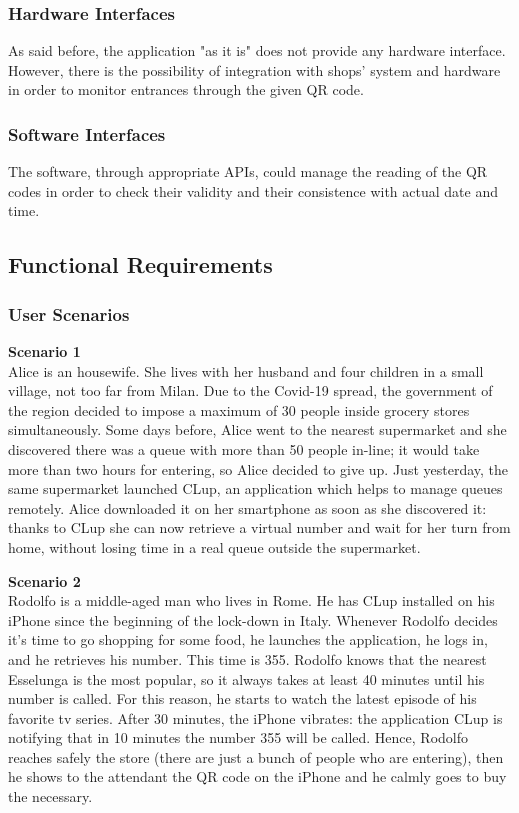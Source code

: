 \documentclass[table, 12pt]{article}
\begin{document}
\subsubsection{Hardware Interfaces}
As said before, the application "as it is" does not provide any hardware interface.
However, there is the possibility of integration with shops' system and hardware in order to monitor entrances through the given QR code.
\subsubsection{Software Interfaces}
The software, through appropriate APIs, could manage the reading of the QR codes in order to check their validity and their consistence with actual date and time.

\begin{minipage}{\textwidth}
    \subsection{Functional Requirements}
    \subsubsection{User Scenarios}
    \textbf{Scenario 1}\\
    Alice is an housewife. She lives with her husband and four children in a small village, not too far from Milan. Due to the Covid-19 spread, the government of the region decided to impose a maximum of 30 people inside grocery stores simultaneously. Some days before, Alice went to the nearest supermarket and she discovered there was a queue with more than 50 people in-line; it would take more than two hours for entering, so Alice decided to give up. Just yesterday, the same supermarket launched CLup, an application which helps to manage queues remotely. Alice downloaded it on her smartphone as soon as she discovered it: thanks to CLup she can now retrieve a virtual number and wait for her turn from home, without losing time in a real queue outside the supermarket.\\
\end{minipage}

\begin{minipage}{\textwidth}
    \textbf{Scenario 2}\\
    Rodolfo is a middle-aged man who lives in Rome. He has CLup installed on his iPhone since the beginning of the lock-down in Italy. Whenever Rodolfo decides it's time to go shopping for some food, he launches the application, he logs in, and he retrieves his number. This time is 355. Rodolfo knows that the nearest Esselunga is the most popular, so it always takes at least 40 minutes until his number is called. For this reason, he starts to watch the latest episode of his favorite tv series. After 30 minutes, the iPhone vibrates: the application CLup is notifying that in 10 minutes the number 355 will be called. Hence, Rodolfo reaches safely the store (there are just a bunch of people who are entering), then he shows to the attendant the QR code on the iPhone and he calmly goes to buy the necessary. \\
\end{minipage}
\end{document}
